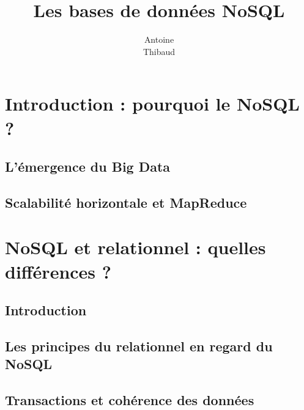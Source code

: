 \documentclass[12pt,titlepage,a4paper]{report}
\title{Les bases de données NoSQL}
\author{Antoine \bsc{Augusti}\\ Thibaud \bsc{Dauce}}
\begin{document}
	\dominitoc
	\tableofcontents

	\chapter*{Introduction : pourquoi le NoSQL ?}
	\minitoc

		\section{L'émergence du Big Data}
			

		\section{Scalabilité horizontale et MapReduce}
			


	\chapter{NoSQL et relationnel : quelles différences ?}
	\minitoc

		\section*{Introduction}
			

		\section{Les principes du relationnel en regard du NoSQL}
      


		\section{Transactions et cohérence des données}
			
\end{document}
